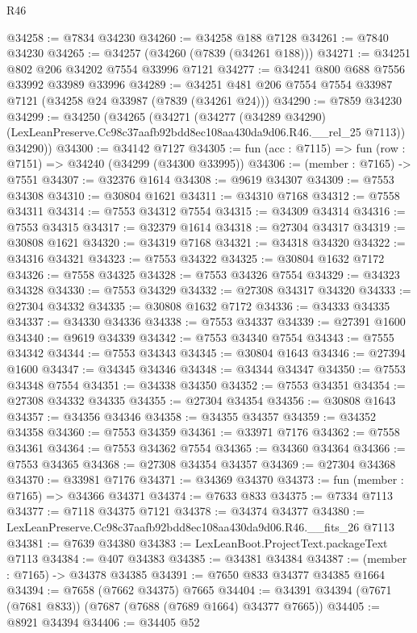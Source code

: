 \begin{lexlean}{R46}
\begin{coremodule}
@34258 := @7834 @34230
@34260 := @34258 @188 @7128
@34261 := @7840 @34230
@34265 := @34257 (@34260 (@7839 (@34261 @188)))
@34271 := @34251 @802 @206 @34202 @7554 @33996 @7121
@34277 := @34241 @800 @688 @7556 @33992 @33989 @33996
@34289 := @34251 @481 @206 @7554 @7554 @33987 @7121 (@34258 @24 @33987 (@7839 (@34261 @24)))
@34290 := @7859 @34230
@34299 := @34250
    (@34265
      (@34271
        (@34277
          (@34289 @34290)
          (LexLeanPreserve.Cc98c37aafb92bdd8ec108aa430da9d06.R46.__rel_25 @7113))
        @34290))
@34300 := @34142 @7127
@34305 := fun (acc : @7115) => fun (row : @7151) => @34240 (@34299 (@34300 @33995))
@34306 := (member : @7165) -> @7551
@34307 := @32376 @1614
@34308 := @9619 @34307
@34309 := @7553 @34308
@34310 := @30804 @1621
@34311 := @34310 @7168
@34312 := @7558 @34311
@34314 := @7553 @34312 @7554
@34315 := @34309 @34314
@34316 := @7553 @34315
@34317 := @32379 @1614
@34318 := @27304 @34317
@34319 := @30808 @1621
@34320 := @34319 @7168
@34321 := @34318 @34320
@34322 := @34316 @34321
@34323 := @7553 @34322
@34325 := @30804 @1632 @7172
@34326 := @7558 @34325
@34328 := @7553 @34326 @7554
@34329 := @34323 @34328
@34330 := @7553 @34329
@34332 := @27308 @34317 @34320
@34333 := @27304 @34332
@34335 := @30808 @1632 @7172
@34336 := @34333 @34335
@34337 := @34330 @34336
@34338 := @7553 @34337
@34339 := @27391 @1600
@34340 := @9619 @34339
@34342 := @7553 @34340 @7554
@34343 := @7555 @34342
@34344 := @7553 @34343
@34345 := @30804 @1643
@34346 := @27394 @1600
@34347 := @34345 @34346
@34348 := @34344 @34347
@34350 := @7553 @34348 @7554
@34351 := @34338 @34350
@34352 := @7553 @34351
@34354 := @27308 @34332 @34335
@34355 := @27304 @34354
@34356 := @30808 @1643
@34357 := @34356 @34346
@34358 := @34355 @34357
@34359 := @34352 @34358
@34360 := @7553 @34359
@34361 := @33971 @7176
@34362 := @7558 @34361
@34364 := @7553 @34362 @7554
@34365 := @34360 @34364
@34366 := @7553 @34365
@34368 := @27308 @34354 @34357
@34369 := @27304 @34368
@34370 := @33981 @7176
@34371 := @34369 @34370
@34373 := fun (member : @7165) => @34366 @34371
@34374 := @7633 @833
@34375 := @7334 @7113
@34377 := @7118 @34375 @7121
@34378 := @34374 @34377
@34380 := LexLeanPreserve.Cc98c37aafb92bdd8ec108aa430da9d06.R46.__fits_26 @7113
@34381 := @7639 @34380
@34383 := LexLeanBoot.ProjectText.packageText @7113
@34384 := @407 @34383
@34385 := @34381 @34384
@34387 := (member : @7165) -> @34378 @34385
@34391 := @7650 @833 @34377 @34385 @1664
@34394 := @7658 (@7662 @34375) @7665
@34404 := @34391 @34394 (@7671 (@7681 @833)) (@7687 (@7688 (@7689 @1664) @34377 @7665))
@34405 := @8921 @34394
@34406 := @34405 @52

\end{coremodule}
\end{lexlean}
